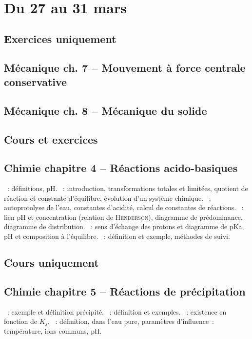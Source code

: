 \documentclass[a4paper, 12pt, final, garamond]{book}
\begin{document}
\setcounter{chapter}{22}

\chapter{Du 27 au 31 mars}

\section{Exercices uniquement}
\section*{Mécanique ch. 7 -- Mouvement à force centrale conservative}
\section*{Mécanique ch. 8 -- Mécanique du solide}

\section{Cours et exercices}
\section*{Chimie chapitre 4 -- Réactions acido-basiques}
\begin{enumerate}[label=\Roman*]
    ~: définitions, pH.
    ~: introduction, transformations totales et
        limitées, quotient de réaction et constante d'équilibre, évolution d'un
        système chimique.
    ~: autoprotolyse de l'eau, constantes
        d'acidité, calcul de constantes de réactions.
    ~: lien pH et concentration
        (relation de \textsc{Henderson}), diagramme de prédominance, diagramme
        de distribution.
    ~: sens d'échange des
        protons et diagramme de pKa, pH et composition à l'équilibre.
    ~: définition et exemple, méthodes de suivi.
\end{enumerate}

\section{Cours uniquement}
\section*{Chimie chapitre 5 -- Réactions de précipitation}
\begin{enumerate}[label=\Roman*]
    ~: exemple et définition précipité.
    ~: définition et exemples.
    ~: existence en fonction de $K_s$.
    ~: définition, dans l'eau pure, paramètres d'influence~:
        température, ions communs, pH.
\end{enumerate}
\end{document}
